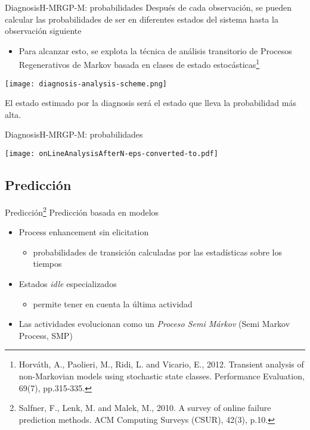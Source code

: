\documentclass[9pt, handout]{beamer}
\begin{document}
      \begin{frame}{Diagnosis}{H-MRGP-M: probabilidades}
        Después de cada observación, se pueden calcular las probabilidades de ser en diferentes estados del sistema hasta la observación siguiente
        \begin{itemize}
          \item Para alcanzar esto, se explota la técnica de análisis transitorio de Procesos Regenerativos de Markov basada en clases de estado estocásticas\footnote{Horváth, A., Paolieri, M., Ridi, L. and Vicario, E., 2012. Transient analysis of non-Markovian models using stochastic state classes. Performance Evaluation, 69(7), pp.315-335.}
        \end{itemize}
        
        \begin{center}
          \texttt{[image: diagnosis-analysis-scheme.png]}
        \end{center}
        
        El estado estimado por la diagnosis será el estado que lleva la probabilidad más alta.
      \end{frame}
      
      \begin{frame}{Diagnosis}{H-MRGP-M: probabilidades}
        \begin{center}
          \texttt{[image: onLineAnalysisAfterN-eps-converted-to.pdf]}
        \end{center}
      \end{frame}
      
    \subsection{Predicción}
      \begin{frame}{Predicción\footnote{Salfner, F., Lenk, M. and Malek, M., 2010. A survey of online failure prediction methods. ACM Computing Surveys (CSUR), 42(3), p.10.}}
        Predicción basada en modelos
        \begin{itemize}
          \item Process enhancement sin elicitation
          \begin{itemize}
            \item probabilidades de transición calculadas por las estadísticas sobre los tiempos
          \end{itemize}
          \item Estados \textit{idle} especializados
          \begin{itemize}
            \item permite tener en cuenta la última actividad
          \end{itemize}
          \item Las actividades evolucionan como un \textit{Proceso Semi Márkov} (Semi Markov Process, SMP)
        \end{itemize}
        
      	\begin{figure}[center]
      		\scalebox{0.7}{}
      	\end{figure}
      \end{frame}
      
\end{document}
